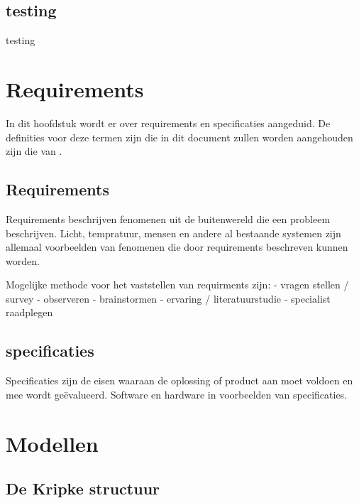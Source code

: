 \documentclass{article}
\begin{document}
\subsection{testing}
testing
\section{Requirements}

In dit hoofdstuk wordt er over requirements en specificaties aangeduid. De definities voor deze termen zijn die in dit document zullen worden aangehouden zijn die van \cite{thompson2000requirements}. \newline

\subsection{Requirements}

Requirements beschrijven fenomenen uit de buitenwereld die een probleem beschrijven. \newline \newline
Licht, tempratuur, mensen en andere al bestaande systemen zijn allemaal voorbeelden van fenomenen die door requirements beschreven kunnen worden. \newline

Mogelijke methode voor het vaststellen van requirments zijn: \newline
- vragen stellen / survey \newline
- observeren \newline
- brainstormen \newline
- ervaring / literatuurstudie \newline
- specialist raadplegen \newline


\subsection{specificaties}

Specificaties zijn de eisen waaraan de oplossing of product aan moet voldoen en mee wordt geëvalueerd. Software en hardware in voorbeelden van specificaties.

\section{Modellen}

\subsection{De Kripke structuur}
\end{document}
